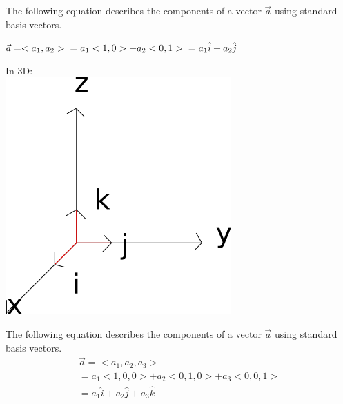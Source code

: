 \documentclass[10pt]{article}
\begin{document}
The following equation describes the components of a vector $\vec{a}  $ using standard basis vectors.

$\vec{a} =<a_1,a_2>\\=a_1<1,0>+a_2<0,1>\\=a_1\hat{i}+a_2\hat{j} $

In 3D:\\\includegraphics{3dstandardbasisvectors} 

The following equation describes the components of a vector $\vec{a}$ using standard basis vectors.
\begin{align}
	\vec{a} =<a_1,a_2,a_3>\\ =a_1<1,0,0>+a_2<0,1,0>+a_3<0,0,1>\\	=a_1\hat{i}+a_2\hat{j}+a_3\hat{k}  
\end{align}
\end{document}
